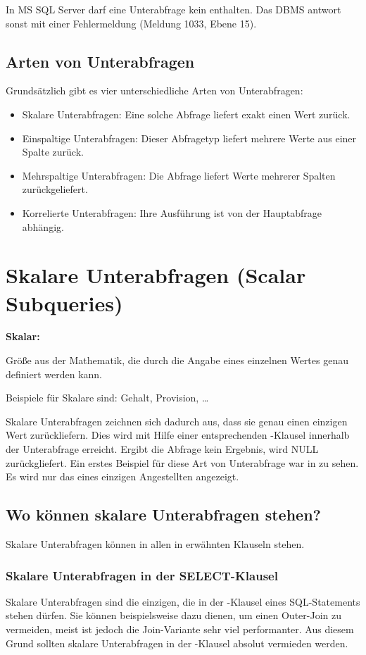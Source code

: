 \begin{merke}
    In MS SQL Server darf eine Unterabfrage kein \ORDERBY{} enthalten. Das DBMS antwort sonst mit einer Fehlermeldung (Meldung 1033, Ebene 15).
\end{merke}
\subsection{Arten von Unterabfragen}
Grundsätzlich gibt es vier unterschiedliche Arten von Unterabfragen:
\begin{itemize}
    \item Skalare Unterabfragen: Eine solche Abfrage liefert exakt einen Wert zurück.
    \item Einspaltige Unterabfragen: Dieser Abfragetyp liefert mehrere Werte aus einer Spalte zurück.
    \item Mehrspaltige Unterabfragen: Die Abfrage liefert Werte mehrerer Spalten zurückgeliefert.
    \item Korrelierte Unterabfragen: Ihre Ausführung ist von der Hauptabfrage abhängig.
\end{itemize}
\clearpage
\section{Skalare Unterabfragen (Scalar Subqueries)}
\begin{merke}
    \textbf{Skalar:}
    \vspace{1em}

    Größe aus der Mathematik, die durch die Angabe eines einzelnen Wertes genau definiert werden kann.
    \vspace{1em}

    Beispiele für Skalare sind: Gehalt, Provision, \dots
\end{merke}
Skalare Unterabfragen zeichnen sich dadurch aus, dass sie genau einen einzigen Wert zurückliefern.   Dies wird mit Hilfe einer entsprechenden \WHERE-Klausel innerhalb der Unterabfrage erreicht. Ergibt die Abfrage kein Ergebnis, wird NULL zurückgliefert. Ein erstes Beispiel für diese Art von Unterabfrage war in  zu sehen. Es wird nur das  eines einzigen Angestellten angezeigt.
\subsection{Wo können skalare Unterabfragen stehen?}
Skalare Unterabfragen können in allen in  erwähnten Klauseln stehen.
\subsubsection{Skalare Unterabfragen in der SELECT-Klausel}
Skalare Unterabfragen sind die einzigen, die in der \SELECT-Klausel eines SQL-Statements stehen dürfen. Sie können beispielsweise dazu dienen, um einen Outer-Join zu vermeiden, meist ist jedoch die Join-Variante sehr viel performanter. Aus diesem Grund sollten skalare Unterabfragen in der \SELECT-Klausel absolut vermieden werden.

